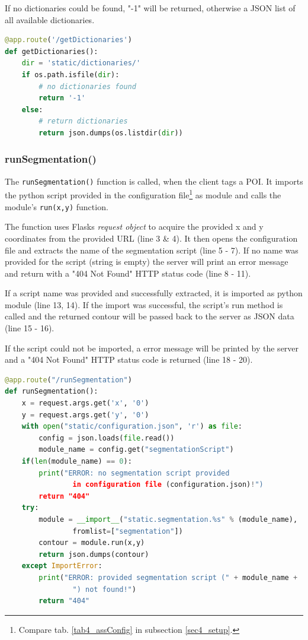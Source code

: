 If no dictionaries could be found, "-1" will be returned, otherwise a JSON list of all available dictionaries.

\begin{lstlisting}[language=Python, frame=single]
@app.route('/getDictionaries')
def getDictionaries():
	dir = 'static/dictionaries/'
	if os.path.isfile(dir):
		# no dictionaries found
		return '-1'
	else:
		# return dictionaries
		return json.dumps(os.listdir(dir))
\end{lstlisting}


\subsubsection{runSegmentation()}
The \texttt{runSegmentation()} function is called, when the client tags a POI. It imports the python script provided in the configuration file\footnote{
	Compare tab. \ref{tab4_assConfig} in subsection \ref{sec4_setup}.
} as module and calls the module's \texttt{run(x,y)} function.

The function uses Flasks \emph{request object} to acquire the provided x and y coordinates from the provided URL (line 3 \& 4). It then opens the configuration file and extracts the name of the segmentation script (line 5 - 7). If no name was provided for the script (string is empty) the server will print an error message and return with a "404 Not Found" HTTP status code (line 8 - 11).

If a script name was provided and successfully extracted, it is imported as python module (line 13, 14). If the import was successful, the script's run method is called and the returned contour will be passed back to the server as JSON data (line 15 - 16).

If the script could not be imported, a error message will be printed by the server and a "404 Not Found" HTTP status code is returned (line 18 - 20).

\begin{lstlisting}[language=Python, frame=single]
@app.route("/runSegmentation")
def runSegmentation():
	x = request.args.get('x', '0')
	y = request.args.get('y', '0')
	with open("static/configuration.json", 'r') as file:
		config = json.loads(file.read())
		module_name = config.get("segmentationScript")
	if(len(module_name) == 0):
		print("ERROR: no segmentation script provided 
				in configuration file (configuration.json)!")
		return "404"
	try:
		module = __import__("static.segmentation.%s" % (module_name),
				fromlist=["segmentation"])
		contour = module.run(x,y)
		return json.dumps(contour)
	except ImportError:
		print("ERROR: provided segmentation script (" + module_name +
				") not found!")
		return "404"
\end{lstlisting}


